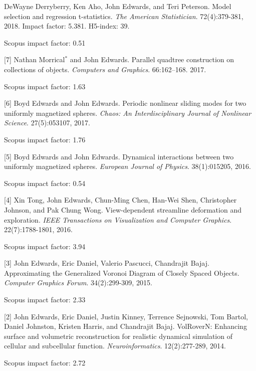 \documentclass[margin,line]{res}
\newcommand{\pubunder}[1]{#1}
\newcommand{\jnum}[1]{[#1]}
\begin{document}
\begin{resume}
\jnum{8} DeWayne Derryberry, Ken Aho, \pubunder{John Edwards}, and Teri Peterson. Model selection and regression t-statistics. \textit{The American Statistician}. 72(4):379-381, 2018. Impact factor: 5.381. H5-index: 39.
\begin{IMPACT}
Scopus impact factor: 0.51 %
\end{IMPACT}

\jnum{7} Nathan Morrical$^*$ and \pubunder{John Edwards}. Parallel quadtree construction on collections of objects. \textit{Computers and Graphics}. 66:162–168. 2017.
\begin{IMPACT}
Scopus impact factor: 1.63 %
\end{IMPACT}

\jnum{6} Boyd Edwards and \pubunder{John Edwards}. Periodic nonlinear sliding modes for two uniformly magnetized spheres. \textit{Chaos: An Interdisciplinary Journal of Nonlinear Science}. 27(5):053107, 2017.
\begin{IMPACT}
Scopus impact factor: 1.76 %
\end{IMPACT}

\jnum{5} Boyd Edwards and \pubunder{John Edwards}. Dynamical interactions between two uniformly magnetized spheres. \textit{European Journal of Physics}. 38(1):015205, 2016.
\begin{IMPACT}
Scopus impact factor: 0.54 %
\end{IMPACT}

\jnum{4} Xin Tong, \pubunder{John Edwards}, Chun-Ming Chen, Han-Wei Shen, Christopher Johnson, and Pak Chung Wong. View-dependent streamline deformation and exploration. \textit{IEEE Transactions on Visualization and Computer Graphics}. 22(7):1788-1801, 2016.
\begin{IMPACT}
Scopus impact factor: 3.94 %
\end{IMPACT}

\jnum{3} \pubunder{John Edwards}, Eric Daniel, Valerio Pascucci, Chandrajit Bajaj. Approximating the Generalized Voronoi Diagram of Closely Spaced Objects. \textit{Computer Graphics Forum}. 34(2):299-309, 2015.
\begin{IMPACT}
Scopus impact factor: 2.33 %
\end{IMPACT}

\jnum{2} \pubunder{John Edwards}, Eric Daniel, Justin Kinney, Terrence Sejnowski, Tom Bartol, Daniel Johnston, Kristen Harris, and Chandrajit Bajaj. VolRoverN: Enhancing surface and volumetric reconstruction for realistic dynamical simulation of cellular and subcellular function.  \textit{Neuroinformatics}. 12(2):277-289, 2014.
\begin{IMPACT}
Scopus impact factor: 2.72 %
\end{IMPACT}


\end{resume}
\end{document}

